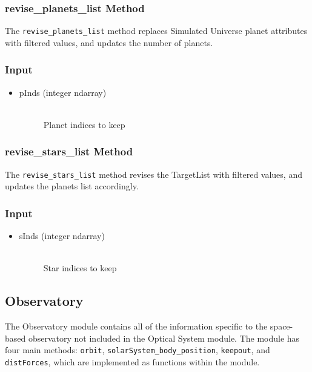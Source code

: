 \documentclass[cleanfoot]{asme2ej}
\begin{document}
\subsubsection{revise\_planets\_list Method} \label{sec:reviseplanetslisttask}
The \verb+revise_planets_list+ method replaces Simulated Universe planet attributes with filtered values, and updates the number of planets.

\subsubsection*{Input}
\begin{itemize}
\item 
\begin{description}
    \item[pInds (integer ndarray)] \hfill \\  Planet indices to keep
\end{description}
\end{itemize}

\subsubsection{revise\_stars\_list Method} \label{sec:revisestarslisttask}
The \verb+revise_stars_list+ method revises the TargetList with filtered values, and updates the planets list accordingly.

\subsubsection*{Input}
\begin{itemize}
\item 
\begin{description}
    \item[sInds (integer ndarray)] \hfill \\  Star indices to keep
\end{description}
\end{itemize}



\subsection{Observatory}
The Observatory module contains all of the information specific to the space-based observatory not included in the Optical System module. The module has four main methods: \verb+orbit+, \verb+solarSystem_body_position+, \verb+keepout+, and \verb+distForces+, which are implemented as functions within the module. 
\end{document}
